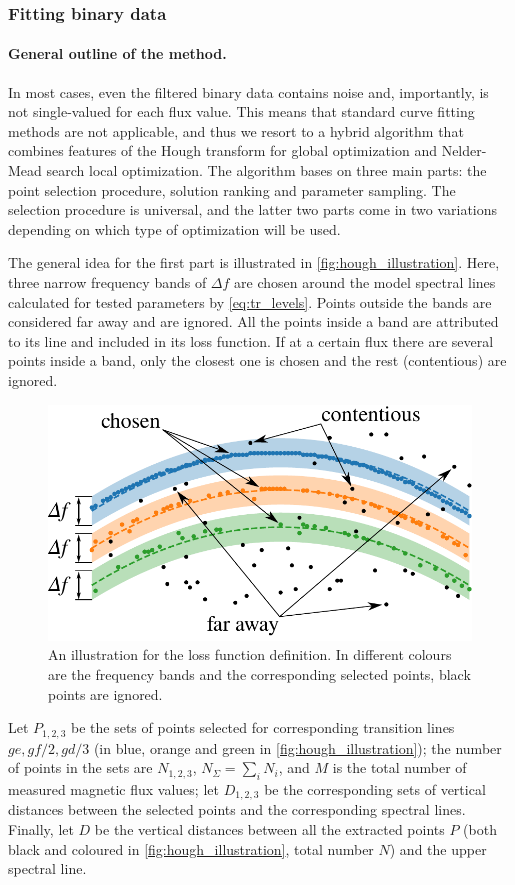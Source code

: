 \documentclass[%
 aip,
 amsmath,amssymb,
 reprint,%
]{revtex4-1}
\begin{document}
\subsubsection{Fitting binary data}

\paragraph{General outline of the method.} In most cases, even the filtered binary data contains noise and, importantly, is not single-valued for each flux value. This means that standard curve fitting methods are not applicable, and thus we resort to a hybrid algorithm that combines features of the Hough transform\cite{hough1962} for global optimization and Nelder-Mead search local optimization. The algorithm bases on three main parts: the point selection procedure, solution ranking and parameter sampling. The selection procedure is universal, and the latter two parts come in two variations depending on which type of optimization will be used.

The general idea for the first part is illustrated in \autoref{fig:hough_illustration}. Here, three narrow frequency bands of $\Delta f$ are chosen around the model spectral lines calculated for tested parameters by \eqref{eq:tr_levels}. Points outside the bands are considered far away and are ignored. All the points inside a band are attributed to its line and included in its loss function. If at a certain flux there are several points inside a band, only the closest one is chosen and the rest (contentious) are ignored. 
\begin{figure}[b]
	\centering
	\includegraphics[width=0.8\linewidth]{hough_illustration}
	\caption{An illustration for the loss function definition. In different colours are the frequency bands and the corresponding selected points, black points are ignored.}
	\label{fig:hough_illustration}
\end{figure}
Let $P_{1,2,3}$ be the sets of points selected for corresponding transition lines $ge, gf/2, gd/3$ (in blue, orange and green in \autoref{fig:hough_illustration}); the number of points in the sets are $N_{1,2,3}$, $N_\Sigma = \sum_i N_i$, and $M$ is the total number of measured magnetic flux values; let $D_{1,2,3}$ be the corresponding sets of vertical distances between the selected points and the corresponding spectral lines. Finally, let $D$ be the vertical distances between all the extracted points $P$ (both black and coloured in \autoref{fig:hough_illustration}, total number $N$) and the upper spectral line.
\end{document}

